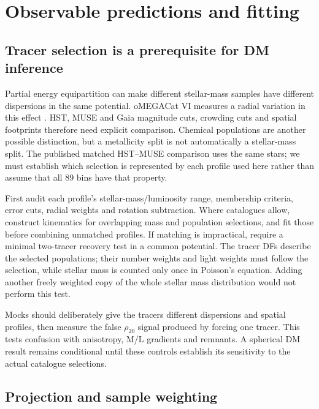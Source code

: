 \documentclass[11pt,a4paper]{article}
\begin{document}
\section{Observable predictions and fitting}

\subsection{Tracer selection is a prerequisite for DM inference}
\label{sec:tracers}

Partial energy equipartition can make different stellar-mass samples have
different dispersions in the same potential. oMEGACat VI measures a radial
variation in this effect \citep{2025ApJ...983...95H}. HST, MUSE and Gaia
magnitude cuts, crowding cuts and spatial footprints therefore need explicit
comparison. Chemical populations are another possible distinction, but a
metallicity split is not automatically a stellar-mass split. The published
matched HST--MUSE comparison uses the same stars; we must establish which
selection is represented by each profile used here rather than assume that
all 89 bins have that property.

First audit each profile's stellar-mass/luminosity range, membership criteria,
error cuts, radial weights and rotation subtraction. Where catalogues allow,
construct kinematics for overlapping mass and population selections, and
fit those before combining unmatched profiles. If matching is impractical,
require a minimal two-tracer recovery test in a common potential. The tracer
DFs describe the selected populations; their number weights and light weights
must follow the selection, while stellar mass is counted only once in
Poisson's equation. Adding another freely weighted copy of the whole stellar
mass distribution would not perform this test.

Mocks should deliberately give the tracers different dispersions and spatial
profiles, then measure the false $\rho_{20}$ signal produced by forcing one
tracer. This tests confusion with anisotropy, M/L gradients and remnants.
A spherical DM result remains conditional until these controls establish its
sensitivity to the actual catalogue selections.


\subsection{Projection and sample weighting}
\end{document}
